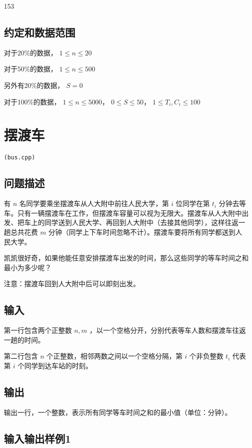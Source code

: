 \documentclass[UTF8]{ctexart}
\begin{document}
153


\subsection{约定和数据范围}

对于20\%的数据， $1\le n\le 20$

对于50\%的数据， $1\le n\le 500$

另外有20\%的数据， $S=0$

对于100\%的数据， $1\le n\le 5000$， $0\le S\le 50$， $1\le T_i,C_i\le 100$

\newpage
\section{摆渡车}
\begin{center}
\tt\large{(bus.cpp)}
\end{center}
\subsection{问题描述}

有 $n$ 名同学要乘坐摆渡车从人大附中前往人民大学，第 $i$ 位同学在第 $t_i$ 分钟去等车。只有一辆摆渡车在工作，但摆渡车容量可以视为无限大。摆渡车从人大附中出发、把车上的同学送到人民大学、再回到人大附中（去接其他同学），这样往返一趟总共花费 $m$ 分钟（同学上下车时间忽略不计）。摆渡车要将所有同学都送到人民大学。

凯凯很好奇，如果他能任意安排摆渡车出发的时间，那么这些同学的等车时间之和最小为多少呢？

注意：摆渡车回到人大附中后可以即刻出发。

\subsection{输入}

第一行包含两个正整数 $n,m$ ，以一个空格分开，分别代表等车人数和摆渡车往返一趟的时间。

第二行包含 $n$ 个正整数，相邻两数之间以一个空格分隔，第 $i$ 个非负整数   $t_i$ 代表第 $i$ 个同学到达车站的时刻。

\subsection{输出}

输出一行，一个整数，表示所有同学等车时间之和的最小值（单位：分钟）。

\subsection{输入输出样例1}
\end{document}
